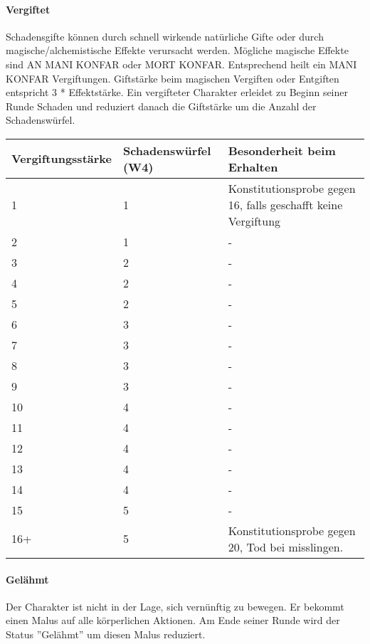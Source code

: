 \documentclass{article}
\begin{document}
\paragraph{Vergiftet}

Schadensgifte können durch schnell wirkende natürliche Gifte oder durch magische/alchemistische Effekte verursacht
werden. Mögliche magische Effekte sind AN MANI KONFAR oder MORT KONFAR. Entsprechend heilt ein MANI KONFAR
Vergiftungen. Giftstärke beim magischen Vergiften oder Entgiften entspricht 3 * Effektstärke. Ein
vergifteter Charakter erleidet zu Beginn seiner Runde Schaden und reduziert danach die Giftstärke um die Anzahl der
Schadenswürfel.


\begin{small}
\begin{tabular}{|m{3cm}|m{4cm}|m{5cm}|}
\hline
\textbf{Vergiftungsstärke}&\textbf{Schadenswürfel (W4)}&\textbf{Besonderheit beim Erhalten}\\
\hline
\hline
1&1&Konstitutionsprobe gegen 16, falls geschafft keine Vergiftung\\
\hline
2&1&-\\
\hline
3&2&-\\
\hline
4&2&-\\
\hline
5&2&-\\
\hline
6&3&-\\
\hline
7&3&-\\
\hline
8&3&-\\
\hline
9&3&-\\
\hline
10&4&-\\
\hline
11&4&-\\
\hline
12&4&-\\
\hline
13&4&-\\
\hline
14&4&-\\
\hline
15&5&-\\
\hline
16+&5&Konstitutionsprobe gegen 20, Tod bei misslingen.\\
\hline
\end{tabular}
\end{small}

\paragraph{Gelähmt}

Der Charakter ist nicht in der Lage, sich vernünftig zu bewegen. Er bekommt einen Malus auf alle körperlichen Aktionen.
Am Ende seiner Runde wird der Status ''Gelähmt'' um diesen Malus reduziert.
\end{document}
